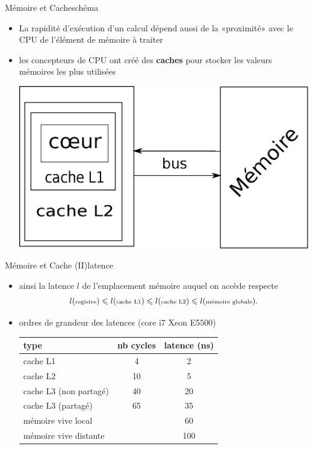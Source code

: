 \documentclass[11pt,mathserif]{beamer}
\newcommand{\gezi}{\faLongArrowRight}
\begin{document}
\begin{frame}{Mémoire et Cache}{schéma}
\begin{itemize}[<+->]
  \item La rapidité d'exécution d'un calcul dépend aussi de la «proximité» avec le CPU de l'élément de mémoire à traiter 
  \item[\gezi] les concepteurs de CPU ont créé des {\bf caches} pour stocker les valeurs mémoires les plus utilisées
  \begin{center}
    \includegraphics[width=0.7\linewidth]{fig/cpu_classique.eps}
  \end{center}
\end{itemize}
\end{frame}
\begin{frame}{Mémoire et Cache (II)}{latence}
\pause
  \begin{itemize}[<+->]
  \item ainsi la latence $l$ de l'emplacement mémoire auquel on accède  respecte
  $$l({\mbox{\scriptsize registre}}) \leqslant l(\mbox{\scriptsize cache L1}) \leqslant
    l(\mbox{\scriptsize cache L2}) \leqslant l(\mbox{\scriptsize mémoire globale}).$$
  \item ordres de grandeur des latences (core i7 Xeon E5500)
    \begin{tabular}{|l|c|c|}
    \hline
      type & nb cycles & latence (ns)  \\
    \hline
      cache L1  &  4 & 2 \\
      cache L2  &  10 & 5 \\
      cache L3 (non partagé) & 40 & 20  \\
      cache L3 (partagé) &  65 & 35  \\
      mémoire vive local & & 60 \\
      mémoire vive distante & & 100 \\
    \hline
    \end{tabular}
  \end{itemize}
\end{frame}
\end{document}
